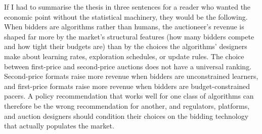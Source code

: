 If I had to summarise the thesis in three sentences for a reader who wanted the economic point without the statistical machinery, they would be the following. When bidders are algorithms rather than humans, the auctioneer's revenue is shaped far more by the market's structural features (how many bidders compete and how tight their budgets are) than by the choices the algorithms' designers make about learning rates, exploration schedules, or update rules. The choice between first-price and second-price auctions does not have a universal ranking. Second-price formats raise more revenue when bidders are unconstrained learners, and first-price formats raise more revenue when bidders are budget-constrained pacers. A policy recommendation that works well for one class of algorithms can therefore be the wrong recommendation for another, and regulators, platforms, and auction designers should condition their choices on the bidding technology that actually populates the market.
